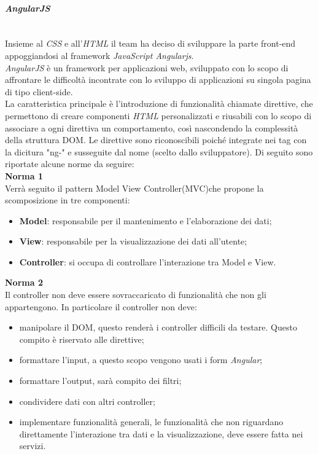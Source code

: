 \paragraph{\textit{AngularJS}} \label{angularjs} \-\\
Insieme al \textit{CSS} e all'\textit{HTML} il team ha deciso di sviluppare la parte front-end appoggiandosi al framework \textit{JavaScript Angularjs}\glossario.\\
\textit{AngularJS} è un framework per applicazioni web, sviluppato con lo scopo di affrontare le difficoltà incontrate con lo sviluppo di applicazioni su singola pagina di tipo client-side.\-\\
La caratteristica principale è l'introduzione di funzionalità chiamate direttive, che permettono di creare componenti \textit{HTML} personalizzati e riusabili con lo scopo di associare a ogni direttiva un comportamento, così nascondendo la complessità della struttura DOM\glossario. Le direttive sono riconoscibili poiché integrate nei tag con la dicitura "ng-" e susseguite dal nome (scelto dallo sviluppatore). 
Di seguito sono riportate alcune norme da seguire:\\
\textbf{Norma 1}\\
Verrà seguito il pattern Model View Controller(MVC)\glossario che propone la scomposizione in tre componenti:
\begin{itemize}
	\item \textbf{Model}: responsabile per il mantenimento e l'elaborazione dei dati;
	\item \textbf{View}: responsabile per la visualizzazione dei dati all'utente;
	\item \textbf{Controller}: si occupa di controllare l'interazione tra Model e View.
\end{itemize} 
\textbf{Norma 2}\\
Il controller non deve essere sovraccaricato di funzionalità che non gli appartengono. In particolare il controller non deve:
\begin{itemize}
	\item manipolare il DOM, questo renderà i controller difficili da testare. Questo compito è riservato alle direttive;
	\item formattare l'input, a questo scopo vengono usati i form \textit{Angular};
	\item formattare l'output, sarà compito dei filtri;
	\item condividere dati con altri controller;
	\item implementare funzionalità generali, le funzionalità che non riguardano direttamente l'interazione tra dati e la visualizzazione, deve essere fatta nei servizi.
\end{itemize}
